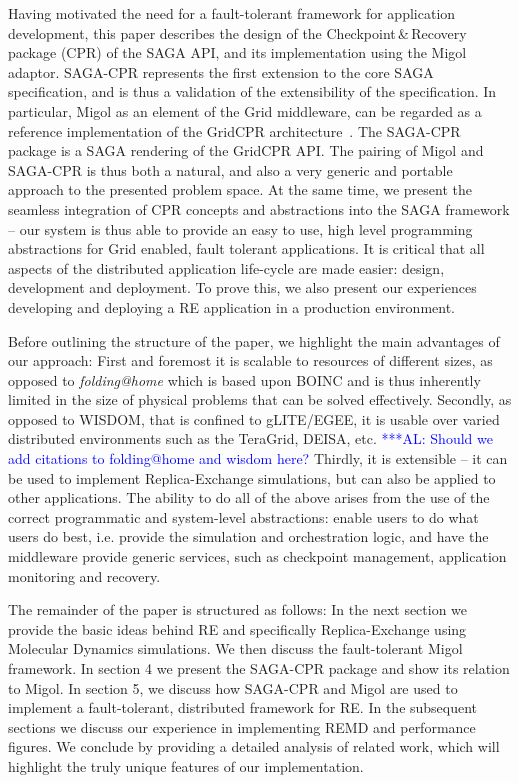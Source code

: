 \documentclass[times, 10pt, twocolumn]{article}
\newcommand{\alnote}[1]{ {\textcolor{blue} { ***AL: #1 }}}
\newcommand{\jhanote}[1]{ {\textcolor{red} { ***SJ: #1 }}}
\newcommand{\alnote}[1]{}
\newcommand{\jhanote}[1]{}
\begin{document}
Having motivated the need for a fault-tolerant framework for
application development, this paper describes the design of the
Checkpoint\,\&\,Recovery package (CPR) of the SAGA API, and its
implementation using the Migol adaptor. SAGA-CPR represents the first
extension to the core SAGA specification, and is thus a validation of
the extensibility of the specification.  In particular, Migol as an
element of the Grid middleware, can be regarded as a reference
implementation of the GridCPR architecture~\cite{ogf_cpr_arch}.  
The SAGA-CPR package is a SAGA rendering of
the GridCPR API.%
The pairing of Migol and SAGA-CPR is thus both a natural, and also a
very generic and portable approach to the presented problem space.  At
the same time, we present the seamless integration of CPR concepts and
abstractions into the SAGA framework -- our system is thus able to
provide an easy to use, high level programming abstractions for Grid
enabled, fault tolerant applications.  It is critical that all aspects
of the distributed application life-cycle are made easier: design,
development and deployment. To prove this, we also present our
experiences developing and deploying a RE application in a production
environment.

Before outlining the structure of the paper, we highlight the main
advantages of our approach: First and foremost it is scalable to
resources of different sizes, as opposed to {\it folding@home}
which is based upon BOINC and is thus inherently limited in the size of
physical problems that can be solved effectively. Secondly, as opposed
to WISDOM, that is confined to gLITE/EGEE, it is usable over varied
distributed environments such as the TeraGrid, DEISA, etc.
\alnote{Should we add citations to folding@home and wisdom here?} 
Thirdly, it is extensible -- it can be used to implement Replica-Exchange simulations, 
but can also be applied to other applications.
The ability to do all of the above arises from the use of the
correct programmatic and system-level abstractions: enable users to do
what users do best, %
i.e. provide the simulation and orchestration logic, and 
have the middleware provide generic services,
such as checkpoint management, application monitoring and recovery.

The remainder of the paper is structured as follows: In the next
section we provide the basic ideas behind RE and specifically
Replica-Exchange using Molecular Dynamics simulations.  We then
discuss the fault-tolerant Migol framework. In section 4 we present
the SAGA-CPR package and show its relation to Migol. In section 5, we
discuss how SAGA-CPR and Migol are used to implement a fault-tolerant,
distributed framework for RE. In the subsequent sections we discuss
our experience in implementing REMD and performance figures. We
conclude by providing a detailed analysis of related work, which will
highlight the truly unique features of our implementation.
\end{document}
